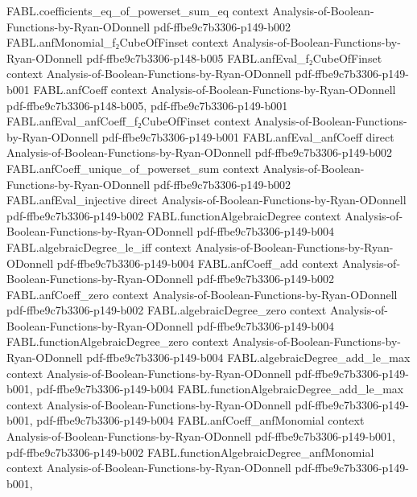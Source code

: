 \begin{theorem}
\proofstep
  {FABL.coefficients_eq_of_powerset_sum_eq}
  {context}
  {Analysis-of-Boolean-Functions-by-Ryan-ODonnell}
  {pdf-ffbe9c7b3306-p149-b002}
\proofstep
  {FABL.anfMonomial_f₂CubeOfFinset}
  {context}
  {Analysis-of-Boolean-Functions-by-Ryan-ODonnell}
  {pdf-ffbe9c7b3306-p148-b005}
\proofstep
  {FABL.anfEval_f₂CubeOfFinset}
  {context}
  {Analysis-of-Boolean-Functions-by-Ryan-ODonnell}
  {pdf-ffbe9c7b3306-p149-b001}
\proofstep
  {FABL.anfCoeff}
  {context}
  {Analysis-of-Boolean-Functions-by-Ryan-ODonnell}
  {pdf-ffbe9c7b3306-p148-b005,
    pdf-ffbe9c7b3306-p149-b001}
\proofstep
  {FABL.anfEval_anfCoeff_f₂CubeOfFinset}
  {context}
  {Analysis-of-Boolean-Functions-by-Ryan-ODonnell}
  {pdf-ffbe9c7b3306-p149-b001}
\proofstep
  {FABL.anfEval_anfCoeff}
  {direct}
  {Analysis-of-Boolean-Functions-by-Ryan-ODonnell}
  {pdf-ffbe9c7b3306-p149-b002}
\proofstep
  {FABL.anfCoeff_unique_of_powerset_sum}
  {context}
  {Analysis-of-Boolean-Functions-by-Ryan-ODonnell}
  {pdf-ffbe9c7b3306-p149-b002}
\proofstep
  {FABL.anfEval_injective}
  {direct}
  {Analysis-of-Boolean-Functions-by-Ryan-ODonnell}
  {pdf-ffbe9c7b3306-p149-b002}
\proofstep
  {FABL.functionAlgebraicDegree}
  {context}
  {Analysis-of-Boolean-Functions-by-Ryan-ODonnell}
  {pdf-ffbe9c7b3306-p149-b004}
\proofstep
  {FABL.algebraicDegree_le_iff}
  {context}
  {Analysis-of-Boolean-Functions-by-Ryan-ODonnell}
  {pdf-ffbe9c7b3306-p149-b004}
\proofstep
  {FABL.anfCoeff_add}
  {context}
  {Analysis-of-Boolean-Functions-by-Ryan-ODonnell}
  {pdf-ffbe9c7b3306-p149-b002}
\proofstep
  {FABL.anfCoeff_zero}
  {context}
  {Analysis-of-Boolean-Functions-by-Ryan-ODonnell}
  {pdf-ffbe9c7b3306-p149-b002}
\proofstep
  {FABL.algebraicDegree_zero}
  {context}
  {Analysis-of-Boolean-Functions-by-Ryan-ODonnell}
  {pdf-ffbe9c7b3306-p149-b004}
\proofstep
  {FABL.functionAlgebraicDegree_zero}
  {context}
  {Analysis-of-Boolean-Functions-by-Ryan-ODonnell}
  {pdf-ffbe9c7b3306-p149-b004}
\proofstep
  {FABL.algebraicDegree_add_le_max}
  {context}
  {Analysis-of-Boolean-Functions-by-Ryan-ODonnell}
  {pdf-ffbe9c7b3306-p149-b001,
    pdf-ffbe9c7b3306-p149-b004}
\proofstep
  {FABL.functionAlgebraicDegree_add_le_max}
  {context}
  {Analysis-of-Boolean-Functions-by-Ryan-ODonnell}
  {pdf-ffbe9c7b3306-p149-b001,
    pdf-ffbe9c7b3306-p149-b004}
\proofstep
  {FABL.anfCoeff_anfMonomial}
  {context}
  {Analysis-of-Boolean-Functions-by-Ryan-ODonnell}
  {pdf-ffbe9c7b3306-p149-b001,
    pdf-ffbe9c7b3306-p149-b002}
\proofstep
  {FABL.functionAlgebraicDegree_anfMonomial}
  {context}
  {Analysis-of-Boolean-Functions-by-Ryan-ODonnell}
  {pdf-ffbe9c7b3306-p149-b001,
}
\end{theorem}
